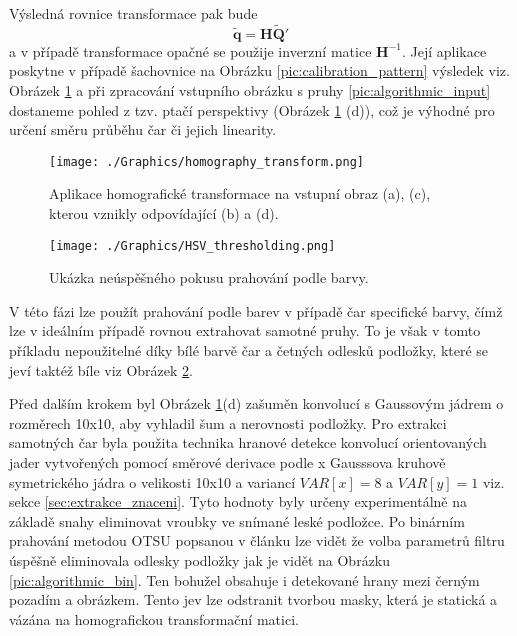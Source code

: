 \documentclass[czech, bc, kky, he, iso690numb]{fasthesis}
\begin{document}
	            Výsledná rovnice transformace pak bude 
	            	\begin{equation}
	            		\widetilde{\mathbf{q}} = \mathbf{H}\widetilde{\mathbf{Q}}'
	            	\end{equation}
	            a v případě transformace opačné se použije inverzní matice \(\mathbf{H}^{-1}\). Její aplikace poskytne v případě šachovnice na Obrázku \ref{pic:calibration_pattern} výsledek viz. Obrázek \ref{pic:algorithmic_warped} a při zpracování vstupního obrázku s pruhy \ref{pic:algorithmic_input} dostaneme pohled z tzv. ptačí perspektivy (Obrázek \ref{pic:algorithmic_warped} (d)), což je výhodné pro určení směru průběhu čar či jejich linearity.
	            
            		\begin{figure}[h]
            			\centering
            			\texttt{[image: ./Graphics/homography\_transform.png]}
            			\caption{Aplikace homografické transformace na vstupní obraz (a), (c), kterou vznikly odpovídající (b) a (d).}
            			\label{pic:algorithmic_warped}
            		\end{figure}
            		
            		\begin{figure}[h]
            			\centering
            			\texttt{[image: ./Graphics/HSV\_thresholding.png]}
            			\caption{Ukázka neúspěšného pokusu prahování podle barvy.}
            			\label{pic:HSV_prahovani}
            		\end{figure}
            	
            	V této fázi lze použít prahování podle barev v případě čar specifické barvy, čímž lze v ideálním případě rovnou extrahovat samotné pruhy. To je však v tomto příkladu nepoužitelné díky bílé barvě čar a četných odlesků podložky, které se jeví taktéž bíle viz Obrázek \ref{pic:HSV_prahovani}.
            	
            	Před dalším krokem byl Obrázek \ref{pic:algorithmic_warped}(d) zašuměn konvolucí s Gaussovým jádrem o rozměrech 10x10, aby vyhladil šum a nerovnosti podložky. Pro extrakci samotných čar byla použita technika hranové detekce konvolucí orientovaných jader vytvořených pomocí směrové derivace podle x Gausssova kruhově symetrického jádra o velikosti 10x10 a variancí \(VAR[x]=8\) a \(VAR[y]=1\) viz. sekce \ref{sec:extrakce_znaceni}. Tyto hodnoty byly určeny experimentálně na základě snahy eliminovat vroubky ve snímané leské podložce. Po binárním prahování metodou OTSU popsanou v článku \cite{otsu_threshold} lze vidět že volba parametrů filtru úspěšně eliminovala odlesky podložky jak je vidět na Obrázku \ref{pic:algorithmic_bin}. Ten bohužel obsahuje i detekované hrany mezi černým pozadím a obrázkem. Tento jev lze odstranit tvorbou masky, která je statická a vázána na homografickou transformační matici.
            		
\end{document}
